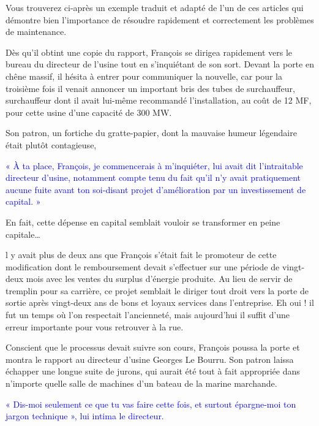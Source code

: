 Vous trouverez ci-après un exemple traduit et adapté de l’un de ces articles qui démontre bien l’importance de résoudre rapidement et correctement les problèmes de maintenance.
\vspace{0.3cm}

Dès qu’il obtint une copie du rapport, François se dirigea rapidement vers le bureau du directeur de l’usine tout en s’inquiétant de son sort. Devant la porte en chêne massif, il hésita à entrer pour communiquer la nouvelle, car pour la troisième fois il venait annoncer un important bris des tubes de surchauffeur, surchauffeur dont il avait lui-même recommandé l’installation, au coût de 12 MF, pour cette usine d’une capacité de 300 MW.

\vspace{0.3cm}

 
Son patron, un fortiche du gratte-papier, dont la mauvaise humeur légendaire était plutôt contagieuse, 

\textcolor{blue}{« À ta place, François, je commencerais à m’inquiéter, lui avait dit l’intraitable directeur d’usine, notamment compte tenu du fait qu’il n’y avait pratiquement aucune fuite avant ton soi-disant projet d’amélioration par un investissement de capital. » }

\vspace{0.3cm}

En fait, cette dépense en capital semblait vouloir se transformer en peine capitale…
\vspace{0.3cm}

l y avait plus de deux ans que François s’était fait le promoteur de cette modification dont le remboursement devait s’effectuer sur une période de vingt-deux mois avec les ventes du surplus d’énergie produite. Au lieu de servir de tremplin pour sa carrière, ce projet semblait le diriger tout droit vers la porte de sortie après vingt-deux ans de bons et loyaux services dans l’entreprise. Eh oui ! il fut un temps où l’on respectait l’ancienneté, mais aujourd’hui il suffit d’une erreur importante pour vous retrouver à la rue.
\vspace{0.3cm}

Conscient que le processus devait suivre son cours, François poussa la porte et montra le rapport au directeur d’usine Georges Le Bourru. Son patron laissa échapper une longue suite de jurons, qui aurait été tout à fait appropriée dans n’importe quelle salle de machines d’un bateau de la marine marchande. 

\textcolor{blue}{« Dis-moi seulement ce que tu vas faire cette fois, et surtout épargne-moi ton jargon technique », lui intima le directeur.}
\vspace{0.3cm}

